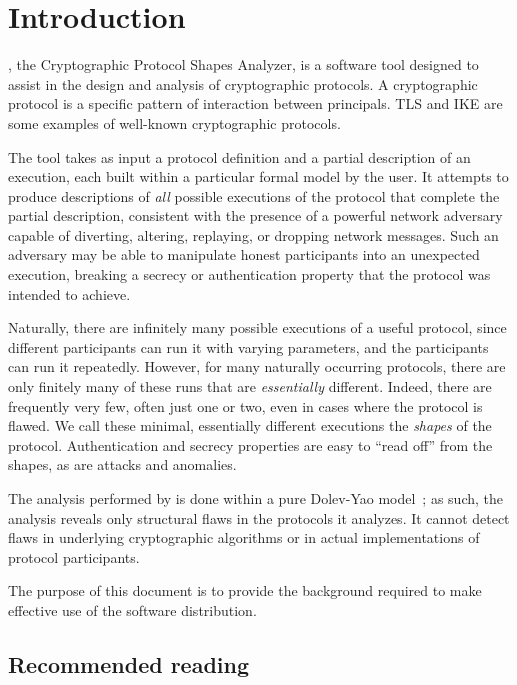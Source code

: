 \chapter{Introduction}
\label{ch:intro}

{\cpsa}, the Cryptographic Protocol Shapes Analyzer, is a software tool
designed to assist in the design and analysis of cryptographic protocols.
A cryptographic protocol is a specific pattern of interaction between
principals.  TLS and IKE are some examples of well-known cryptographic protocols.

The tool takes as input a protocol definition and a partial
description of an execution, each built within a particular formal
model by the user.  It attempts to produce descriptions of \emph{all}
possible executions of the protocol that complete the partial
description, consistent with the presence of a powerful network adversary
capable of diverting, altering, replaying, or dropping network messages.
Such an adversary may be able to manipulate honest participants into an
unexpected execution, breaking a secrecy or authentication property that
the protocol was intended to achieve.

Naturally, there are infinitely many possible executions of a useful
protocol, since different participants can run it with varying
parameters, and the participants can run it repeatedly.  However, for
many naturally occurring protocols, there are only finitely many of
these runs that are \emph{essentially} different.  Indeed, there are
frequently very few, often just one or two, even in cases where the
protocol is flawed.  We call these minimal, essentially different
executions the \emph{shapes} of the protocol.  Authentication and
secrecy properties are easy to ``read off'' from the shapes, as are
attacks and anomalies.

The analysis performed by {\cpsa} is done within a pure Dolev-Yao
model~\cite{DolevYao83}; as such, the analysis reveals only structural
flaws in the protocols it analyzes.  It cannot detect flaws in underlying
cryptographic algorithms or in actual implementations of protocol participants.

The purpose of this document is to provide the background required to
make effective use of the {\cpsa} software distribution.

\section{Recommended reading}

